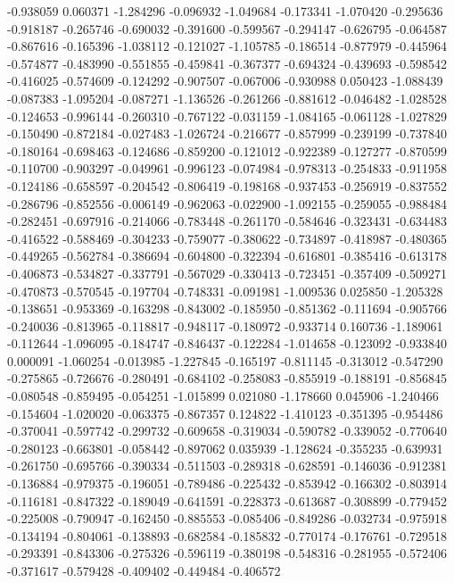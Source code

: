 -0.938059
0.060371
-1.284296
-0.096932
-1.049684
-0.173341
-1.070420
-0.295636
-0.918187
-0.265746
-0.690032
-0.391600
-0.599567
-0.294147
-0.626795
-0.064587
-0.867616
-0.165396
-1.038112
-0.121027
-1.105785
-0.186514
-0.877979
-0.445964
-0.574877
-0.483990
-0.551855
-0.459841
-0.367377
-0.694324
-0.439693
-0.598542
-0.416025
-0.574609
-0.124292
-0.907507
-0.067006
-0.930988
0.050423
-1.088439
-0.087383
-1.095204
-0.087271
-1.136526
-0.261266
-0.881612
-0.046482
-1.028528
-0.124653
-0.996144
-0.260310
-0.767122
-0.031159
-1.084165
-0.061128
-1.027829
-0.150490
-0.872184
-0.027483
-1.026724
-0.216677
-0.857999
-0.239199
-0.737840
-0.180164
-0.698463
-0.124686
-0.859200
-0.121012
-0.922389
-0.127277
-0.870599
-0.110700
-0.903297
-0.049961
-0.996123
-0.074984
-0.978313
-0.254833
-0.911958
-0.124186
-0.658597
-0.204542
-0.806419
-0.198168
-0.937453
-0.256919
-0.837552
-0.286796
-0.852556
-0.006149
-0.962063
-0.022900
-1.092155
-0.259055
-0.988484
-0.282451
-0.697916
-0.214066
-0.783448
-0.261170
-0.584646
-0.323431
-0.634483
-0.416522
-0.588469
-0.304233
-0.759077
-0.380622
-0.734897
-0.418987
-0.480365
-0.449265
-0.562784
-0.386694
-0.604800
-0.322394
-0.616801
-0.385416
-0.613178
-0.406873
-0.534827
-0.337791
-0.567029
-0.330413
-0.723451
-0.357409
-0.509271
-0.470873
-0.570545
-0.197704
-0.748331
-0.091981
-1.009536
0.025850
-1.205328
-0.138651
-0.953369
-0.163298
-0.843002
-0.185950
-0.851362
-0.111694
-0.905766
-0.240036
-0.813965
-0.118817
-0.948117
-0.180972
-0.933714
0.160736
-1.189061
-0.112644
-1.096095
-0.184747
-0.846437
-0.122284
-1.014658
-0.123092
-0.933840
0.000091
-1.060254
-0.013985
-1.227845
-0.165197
-0.811145
-0.313012
-0.547290
-0.275865
-0.726676
-0.280491
-0.684102
-0.258083
-0.855919
-0.188191
-0.856845
-0.080548
-0.859495
-0.054251
-1.015899
0.021080
-1.178660
0.045906
-1.240466
-0.154604
-1.020020
-0.063375
-0.867357
0.124822
-1.410123
-0.351395
-0.954486
-0.370041
-0.597742
-0.299732
-0.609658
-0.319034
-0.590782
-0.339052
-0.770640
-0.280123
-0.663801
-0.058442
-0.897062
0.035939
-1.128624
-0.355235
-0.639931
-0.261750
-0.695766
-0.390334
-0.511503
-0.289318
-0.628591
-0.146036
-0.912381
-0.136884
-0.979375
-0.196051
-0.789486
-0.225432
-0.853942
-0.166302
-0.803914
-0.116181
-0.847322
-0.189049
-0.641591
-0.228373
-0.613687
-0.308899
-0.779452
-0.225008
-0.790947
-0.162450
-0.885553
-0.085406
-0.849286
-0.032734
-0.975918
-0.134194
-0.804061
-0.138893
-0.682584
-0.185832
-0.770174
-0.176761
-0.729518
-0.293391
-0.843306
-0.275326
-0.596119
-0.380198
-0.548316
-0.281955
-0.572406
-0.371617
-0.579428
-0.409402
-0.449484
-0.406572
